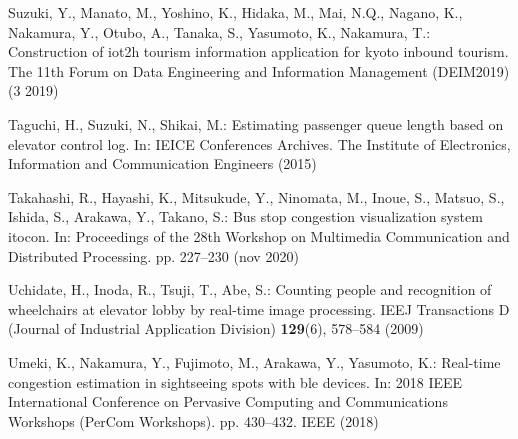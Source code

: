 \begin{thebibliography}{8}
  Suzuki, Y., Manato, M., Yoshino, K., Hidaka, M., Mai, N.Q., Nagano, K.,
  Nakamura, Y., Otubo, A., Tanaka, S., Yasumoto, K., Nakamura, T.: Construction
  of iot2h tourism information application for kyoto inbound tourism. The 11th
  Forum on Data Engineering and Information Management (DEIM2019)  (3 2019)

  Taguchi, H., Suzuki, N., Shikai, M.: Estimating passenger queue length based on
  elevator control log. In: IEICE Conferences Archives. The Institute of
  Electronics, Information and Communication Engineers (2015)

  Takahashi, R., Hayashi, K., Mitsukude, Y., Ninomata, M., Inoue, S., Matsuo, S.,
  Ishida, S., Arakawa, Y., Takano, S.: Bus stop congestion visualization system
  itocon. In: Proceedings of the 28th Workshop on Multimedia Communication and
  Distributed Processing. pp. 227--230 (nov 2020)

  Uchidate, H., Inoda, R., Tsuji, T., Abe, S.: Counting people and recognition of
  wheelchairs at elevator lobby by real-time image processing. IEEJ
  Transactions D (Journal of Industrial Application Division)  \textbf{129}(6),
  578--584 (2009)

  \thispagestyle{kisuu}

  Umeki, K., Nakamura, Y., Fujimoto, M., Arakawa, Y., Yasumoto, K.: Real-time
  congestion estimation in sightseeing spots with ble devices. In: 2018 IEEE
  International Conference on Pervasive Computing and Communications Workshops
  (PerCom Workshops). pp. 430--432. IEEE (2018)
\end{thebibliography}
